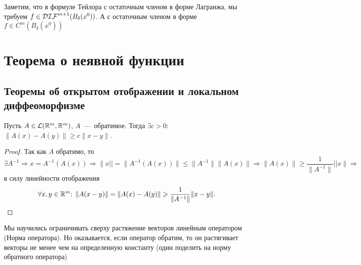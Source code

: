 \begin{note} 
Заметим, что в формуле Тейлора с остаточным членом в форме Лагранжа, мы требуем $f \in \mathcal{DIF}^{m + 1}(B_{\delta}(x^{0}))$. А с остаточным членом в форме $f \in C^m(B_\delta(x^0))$
\end{note}

\newpage
\section{Теорема о неявной функции}

\subsection{Теоремы об открытом отображении и локальном диффеоморфизме}
\begin{lemma}
    Пусть $A \in \mathcal{L}(\mathbb{R}^m, \mathbb{R}^m)$,  $A$~---~обратимое. Тогда $\exists c > 0$: $\|A(x) - A(y)\| \geq c\|x - y\|$.
\end{lemma}
\begin{proof}
    Так как $A$ обратимо, то $\exists A^{-1} \Rightarrow x = A^{-1}(A(x)) \Rightarrow \|x|| = \|A^{-1}(A(x))\| \leq \|A^{-1}\|\|A(x)\| \Rightarrow \|A(x)\| \geq \dfrac{1}{\|A^{-1}\|} ||x\| \Rightarrow$ в силу линейности отображения $$\forall x, y \in \mathbb{R}^m\text{: }\|A(x - y)\| = \|A(x) - A(y)\| \geqslant \dfrac{1}{\|A^{-1}\|}\|x - y\|.$$
\end{proof}

\begin{note}
    Мы научились ограничивать сверху растяжение векторов линейным оператором (Норма оператора). Но оказывается, если оператор обратим, то он растягивает векторы не менее чем на определенную константу (один поделить на норму обратного оператора)
\end{note}
 

